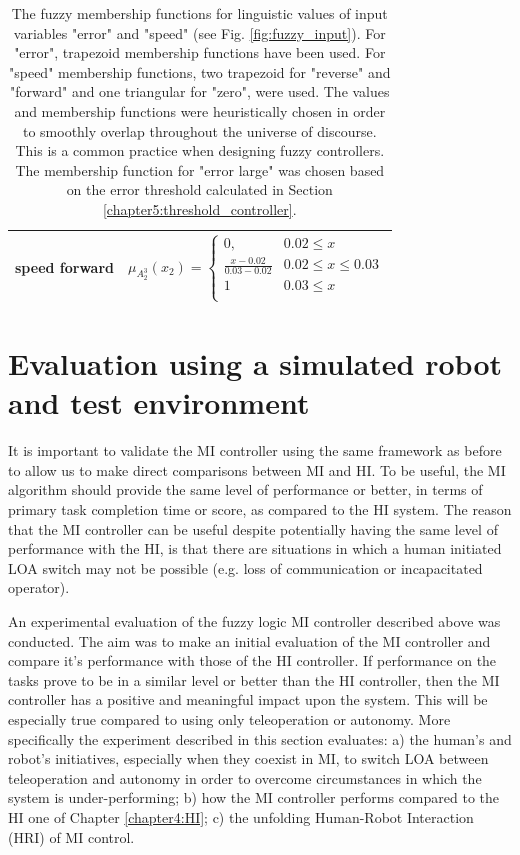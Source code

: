 \documentclass[a4paper,12pt,oneside,openright]{bhamthesis}
\begin{document}
\begin{table}
\begin{tabular}{|c|c|}
     speed forward   & $ \mu_{A_2^3}(x_2) = \begin{cases}
     0,  & 0.02 \leq  x \\
     \frac{x-0.02}{0.03-0.02}  &  0.02  \leq x \leq 0.03 \\
     1  &  0.03  \leq x   \\
     \end{cases} $ \\ \hline
    

     \end{tabular}
     \caption {The fuzzy membership functions for linguistic values of input variables "error" and "speed" (see Fig. \ref{fig:fuzzy_input}). For "error", trapezoid membership functions have been used. For "speed" membership functions, two trapezoid for "reverse" and "forward" and one triangular for "zero", were used. The values and membership functions were heuristically chosen in order to smoothly overlap throughout the universe of discourse. This is a common practice when designing fuzzy controllers. The membership function for "error large" was chosen based on the error threshold calculated in Section \ref{chapter5:threshold_controller}.}
     \label{table:membership_functions}
 \end{table}

\section{Evaluation using a simulated robot and test environment}
\label{chapter5:experiment2_2}

It is important to validate the MI controller using the same framework as before to allow us to make direct comparisons between MI and HI. To be useful, the MI algorithm should provide the same level of performance or better, in terms of primary task completion time or score, as compared to the HI system. The reason that the MI controller can be useful despite potentially having the same level of performance with the HI, is that there are situations in which a human initiated LOA switch may not be possible (e.g. loss of communication or incapacitated operator).


An experimental evaluation of the fuzzy logic MI controller described above was conducted. The aim was to make an initial evaluation of the MI controller and compare it's performance with those of the HI controller. If performance on the tasks prove to be in a similar level or better than the HI controller, then the MI controller has a positive and meaningful impact upon the system. This will be especially true compared to using only teleoperation or autonomy. More specifically the experiment described in this section evaluates: a) the human's and robot's initiatives, especially when they coexist in MI, to switch LOA between teleoperation and autonomy in order to overcome circumstances in which the system is under-performing; b) how the MI controller performs compared to the HI one of Chapter \ref{chapter4:HI}; c) the unfolding Human-Robot Interaction (HRI) of MI control. 
\end{document}
